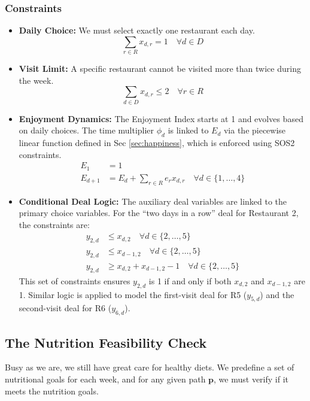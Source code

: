 \documentclass{article}
\begin{document}
\subsubsection*{Constraints}
\label{sec:constraints}
\begin{itemize}
    \item \textbf{Daily Choice:} We must select exactly one restaurant each day.
    \[ \sum_{r \in R} x_{d,r} = 1 \quad \forall d \in D \]

    \item \textbf{Visit Limit:} A specific restaurant cannot be visited more than twice during the week.
    \[ \sum_{d \in D} x_{d,r} \le 2 \quad \forall r \in R \]

    \item \textbf{Enjoyment Dynamics:} The Enjoyment Index starts at 1 and evolves based on daily choices. The time multiplier $\phi_d$ is linked to $E_d$ via the piecewise linear function defined in Sec \ref{sec:happiness}, which is enforced using SOS2 constraints.
    \begin{align*}
    E_1 &= 1 \\
    E_{d+1} &= E_d + \sum_{r \in R} e_r x_{d,r} \quad \forall d \in \{1, \dots, 4\}
    \end{align*}

    \item \textbf{Conditional Deal Logic:} The auxiliary deal variables are linked to the primary choice variables. For the ``two days in a row'' deal for Restaurant 2, the constraints are:
    \begin{align*}
    y_{2,d} &\le x_{d,2} \quad \forall d \in \{2, \dots, 5\} \\
    y_{2,d} &\le x_{d-1,2} \quad \forall d \in \{2, \dots, 5\} \\
    y_{2,d} &\ge x_{d,2} + x_{d-1,2} - 1 \quad \forall d \in \{2, \dots, 5\}
    \end{align*}
    This set of constraints ensures $y_{2,d}$ is 1 if and only if both $x_{d,2}$ and $x_{d-1,2}$ are 1. Similar logic is applied to model the first-visit deal for R5 ($y_{5,d}$) and the second-visit deal for R6 ($y_{6,d}$).
\end{itemize}






\subsection{The Nutrition Feasibility Check}
\label{sec:nutrition}
Busy as we are, we still have great care for healthy diets. We predefine a set of nutritional goals for each week, and for any given path $\mathbf{p}$, we must verify if it meets the nutrition goals.
\end{document}
